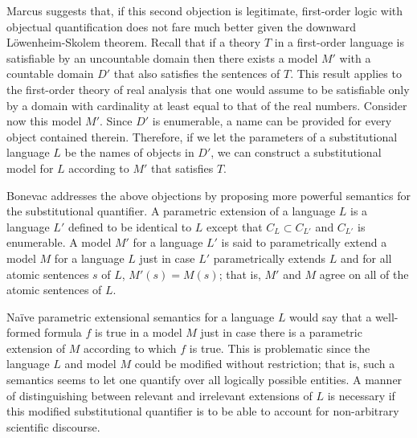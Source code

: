 Marcus \cite{marcus95} suggests that, if this second objection is legitimate,
first-order logic with objectual quantification does not fare much
better given the downward L\"owenheim-Skolem theorem.  Recall that if a theory
$T$ in a first-order language is satisfiable by an uncountable domain
then there exists a model $M'$ with a countable domain $D'$ that also
satisfies the sentences of $T$.  This result applies to the
first-order theory of real analysis that one would assume to be
satisfiable only by a domain with cardinality at least equal to that
of the real numbers. 
Consider now this model $M'$.  
Since $D'$ is
enumerable, a name can be provided for every object contained therein.
Therefore, if we let the parameters of a substitutional language $L$
be the names of objects in $D'$, we can construct a substitutional
model for $L$ according to $M'$ that satisfies $T$.

Bonevac \cite{bonevac84} addresses the above objections by proposing 
more powerful semantics for the substitutional quantifier.  A
parametric extension of a language $L$ is a language $L'$ defined to
be identical to $L$ except that $C_L \subset C_{L'}$ and $C_{L'}$ is
enumerable.  A model $M'$ for a language $L'$ is said to
parametrically extend a model $M$ for a language $L$ just in case $L'$
parametrically extends $L$ and for all atomic sentences $s$ of $L$,
$M'(s) = M(s)$; that is, $M'$ and $M$ agree on all of the atomic
sentences of $L$.  

Na\"ive parametric extensional semantics for a language $L$ would say
that a well-formed formula $f$ is true in a model $M$ just in case
there is a parametric extension of $M$ according to which $f$ is
true. This is problematic since the language $L$ and
model $M$ could be modified without restriction; that is, such a
semantics seems to let one quantify over all logically possible
entities.   A manner of distinguishing between relevant and irrelevant
extensions of $L$ is necessary if this modified substitutional
quantifier is to be able to account for non-arbitrary scientific
discourse.


